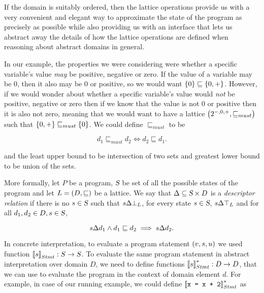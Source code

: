 \documentclass[..thesis.tex]{subfiles}
\begin{document}
If the domain is suitably ordered, then the lattice operations provide us with a very convenient and elegant way to approximate the state of the program as precisely as possible while also providing us with an interface that lets us abstract away the details of how the lattice operations are defined when reasoning about abstract domains in general. 

In our example, the properties we were considering were whether a specific variable's value \textit{may} be positive, negative or zero. If the value of a variable may be $0$, then it also may be $0$ or positive, so we would want $\left\lbrace 0 \right\rbrace \sqsubseteq \left\lbrace 0, + \right\rbrace$. However, if we would wonder about whether a specific variable's value would \textit{not} be positive, negative or zero then if we know that the value is not 0 or positive then it is also not zero, meaning that we would want to have a lattice $\left( 2^{-,0,+}, \sqsubseteq_{must} \right)$ such that $\left\lbrace 0 , + \right\rbrace \sqsubseteq_{must} \left\lbrace 0 \right\rbrace$. We could define $\sqsubseteq_{must}$ to be

\begin{equation*}
d_1 \sqsubseteq_{must} d_2 \iff d_2 \sqsubseteq d_1 \text{.} 
\end{equation*} 

and the least upper bound to be intersection of two sets and greatest lower bound to be union of the sets.




More formally, let $P$ be a program, $\textsl{S}$ be set of all the possible states of the program and let $L = \left( D, \sqsubseteq \right)$ be a lattice. We say that $\Delta \subseteq \textsl{S} \times D$ is a \textit{descriptor relation} if there is no $s \in \textsl{S}$ such that $s \Delta \bot_L$, for every state $s \in \textsl{S}$, $s \Delta \top_L$ and for all $d_1,d_2 \in D, s \in \textsl{S}$,

\begin{equation*}
s \Delta d_1 \land d_1 \sqsubseteq d_2 \implies s \Delta d_2 \text{.}
\end{equation*}

In concrete interpretation, to evaluate a program statement $\left( v, s, u \right)$ we used function $\left\llbracket s \right\rrbracket_{Stmt} : S \to S$. To evaluate the same program statement in abstract interpretation over domain $D$, we need to define functions $\left\llbracket s \right\rrbracket_{Stmt}^{*} : D \to D$, that we can use to evaluate the program in the context of domain element $d$. For example, in case of our running example, we could define $\left\llbracket \text{\texttt{x =  x + 2}} \right\rrbracket_{Stmt}^{*}$ as
\end{document}

